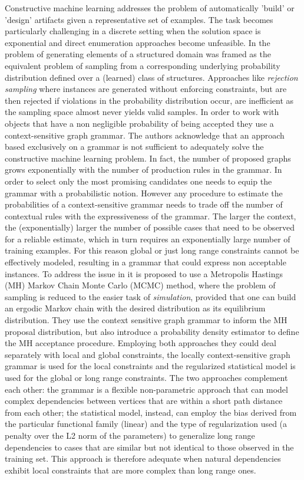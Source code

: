 \documentclass{article}
\begin{document}
Constructive machine learning addresses the problem of automatically 'build'
or 'design' artifacts given a representative set of examples. The task becomes
particularly challenging in a discrete setting when the solution space is
exponential and direct enumeration approaches become unfeasible. In
\cite{costa16} the problem of generating elements of a structured domain was
framed as the equivalent problem of sampling from a corresponding underlying
probability distribution defined over a (learned) class of structures.
Approaches like {\em rejection sampling} where instances are generated without
enforcing constraints, but are then rejected if violations in the probability
distribution occur, are inefficient as the sampling space almost never yields
valid samples. In order to work with objects that have a non negligible
probability of being accepted they use a context-sensitive graph grammar. The
authors acknowledge that an approach based exclusively on a grammar is not
sufficient to adequately solve the constructive machine learning problem. In
fact, the number of proposed graphs grows exponentially with the number of
production rules in the grammar. In order to select only the most promising
candidates one needs to equip the grammar with a probabilistic notion. However
any procedure to estimate the probabilities of a context-sensitive grammar
needs to trade off the number of contextual rules with the expressiveness of
the grammar. The larger the context, the (exponentially) larger the number of
possible cases that need to be observed for a reliable estimate, which in turn
requires an exponentially large number of training examples. For this reason
global or just long range constraints cannot be effectively modeled, resulting
in a grammar that could express non acceptable instances. To address the issue
in \cite{costa16} it is proposed to use a Metropolis Hastings (MH) Markov
Chain Monte Carlo (MCMC) method, where the problem of sampling is reduced to
the easier task of {\em simulation}, provided that one can build an ergodic
Markov chain with the desired distribution as its equilibrium distribution.
They use the context sensitive graph grammar to inform the MH proposal
distribution, but also introduce a probability density estimator to define the
MH acceptance procedure. Employing both approaches they could deal
separately with local and global constraints, the locally context-sensitive
graph grammar is used for the local constraints and the regularized statistical
model is used for the global or long range constraints. The two approaches
complement each other: the grammar is a flexible non-parametric approach that
can model complex dependencies between vertices that are within a short path
distance from each other; the statistical model, instead, can employ the bias
derived from the particular functional family (linear) and the type of
regularization used (a penalty over the L2 norm of the parameters) to
generalize long range dependencies to cases that are similar but not identical
to those observed in the training set. This approach is therefore adequate
when natural dependencies exhibit local constraints that are more complex than
long range ones.
\end{document}
